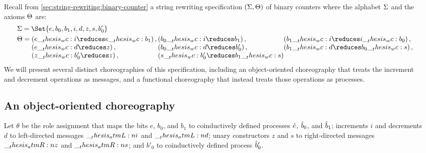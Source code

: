 Recall from \cref{sec:string-rewriting:binary-counter} a string rewriting specification $(\Sigma, \Theta)$ of binary counters where the alphabet $\Sigma$ and the axioms $\Theta$ are:
\begin{equation*}
  \begin{lgathered}
    \sralph = \Set{e, b_0, b_1, i, d, z, s, b'_0}
    \\
    \srsig
      = \begin{array}[t]{@{}l@{}l@{}l@{}}
          (e \wc i \reduces e \wc b_1) \,, {} &
          (b_0 \wc i \reduces b_1) \,, &
          (b_1 \wc i \reduces i \wc b_0) \,, \\
          (e \wc d \reduces z) \,, &
          (b_0 \wc d \reduces b'_0) \,, {} &
          (b_1 \wc d \reduces b_0 \wc s) \,, \\
          (z \wc b'_0 \reduces z) \,, &
          (s \wc b'_0 \reduces b_1 \wc s)
        \end{array}
  \end{lgathered}
\end{equation*}
We will present several distinct choreographies of this specification, including an object-oriented choreography that treats the increment and decrement operations as messages, and a functional choreography that instead treats those operations as processes. 


\subsection{An object-oriented choreography}\label{sec:formula-as-process:counters-oo}

Let $\theta$ be%
the role assignment that maps the bits $e$, $b_0$, and $b_1$ to coinductively defined processes $\hat{e}$, $\hat{b}_0$, and $\hat{b}_1$; increments $i$ and decrements $d$ to left-directed messages $\__thesis_atmL:n {i}$ and $\__thesis_atmL:n {d}$; unary constructors $z$ and $s$ to right-directed messages $\__thesis_atmR:n {z}$ and $\__thesis_atmR:n {s}$; and $b'_0$ to coinductively defined process $\hat{b}'_0$.%


